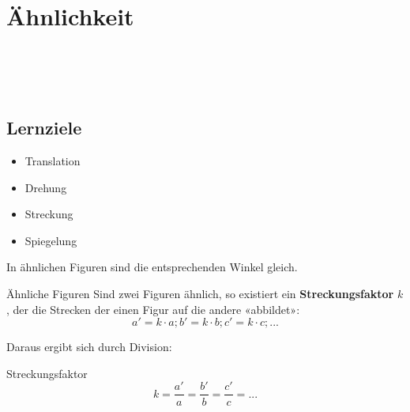 
\section{Ähnlichkeit}
\\
\\
\\

\subsection*{Lernziele}

\begin{itemize}
\item Translation
\item Drehung
\item Streckung
\item Spiegelung
\end{itemize}


In ähnlichen Figuren sind die entsprechenden Winkel gleich.

\begin{definition}{Ähnliche Figuren}{}
Sind zwei Figuren ähnlich, so existiert ein \textbf{Streckungsfaktor}
$k$, der die Strecken der einen Figur auf die andere «abbildet»:
$$a' = k\cdot{}a; b' = k\cdot{}b; c' = k\cdot{} c; ...$$
\end{definition}

Daraus ergibt sich durch Division:
\begin{gesetz}{Streckungsfaktor}{}
  $$k = \frac{a'}{a} = \frac{b'}{b} = \frac{c'}{c} = ...$$
\end{gesetz}

